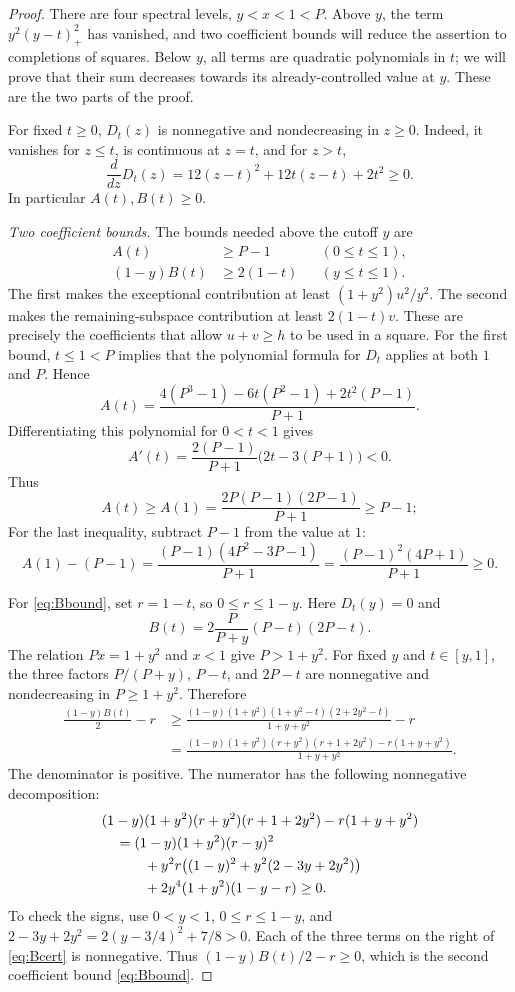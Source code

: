 \documentclass[11pt]{article}
\numberwithin{equation}{section}
\begin{document}
\begin{proof}
There are four spectral levels, $y<x<1<P$. Above $y$, the term
$y^2(y-t)_+^2$ has vanished, and two coefficient bounds will reduce
the assertion to completions of squares. Below $y$, all terms are
quadratic polynomials in $t$; we will prove that their sum decreases
towards its already-controlled value at $y$. These are the two parts
of the proof.

For fixed $t\ge0$, $D_t(z)$ is nonnegative and nondecreasing
in $z\ge0$. Indeed, it vanishes for $z\le t$, is continuous
at $z=t$, and for $z>t$,
\[
 \frac{d}{dz}D_t(z)=12(z-t)^2+12t(z-t)+2t^2\ge0.
\]
In particular $A(t),B(t)\ge0$.

\smallskip
\noindent\emph{Two coefficient bounds.}
The bounds needed above the cutoff $y$ are
\begin{align}
 A(t)&\ge P-1 &&(0\le t\le1),\label{eq:Abound}\\
 (1-y)B(t)&\ge2(1-t) &&(y\le t\le1).\label{eq:Bbound}
\end{align}
The first makes the exceptional contribution at least
$(1+y^2)u^2/y^2$. The second makes the remaining-subspace
contribution at least $2(1-t)v$. These are precisely the
coefficients that allow $u+v\ge h$ to be used in a square.
For the first bound, $t\le1<P$ implies that the polynomial
formula for $D_t$ applies at both $1$ and $P$. Hence
\[
 A(t)=\frac{4(P^3-1)-6t(P^2-1)+2t^2(P-1)}{P+1}.
\]
Differentiating this polynomial for $0<t<1$ gives
\[
 A'(t)=\frac{2(P-1)}{P+1}\bigl(2t-3(P+1)\bigr)<0.
\]
Thus
\[
 A(t)\ge A(1)=\frac{2P(P-1)(2P-1)}{P+1}\ge P-1;
\]
For the last inequality, subtract $P-1$ from the value at $1$:
\[
 A(1)-(P-1)
  =\frac{(P-1)(4P^2-3P-1)}{P+1}
  =\frac{(P-1)^2(4P+1)}{P+1}\ge0.
\]

For \eqref{eq:Bbound}, set $r=1-t$, so $0\le r\le1-y$. Here $D_t(y)=0$ and
\[
 B(t)=2\frac{P}{P+y}(P-t)(2P-t).
\]
The relation $Px=1+y^2$ and $x<1$ give $P>1+y^2$.
For fixed $y$ and $t\in[y,1]$, the three factors
$P/(P+y)$, $P-t$, and $2P-t$ are nonnegative and nondecreasing
in $P\ge1+y^2$. Therefore
\begin{align*}
 \frac{(1-y)B(t)}2-r
 &\ge\frac{(1-y)(1+y^2)(1+y^2-t)(2+2y^2-t)}{1+y+y^2}-r\\
 &=\frac{(1-y)(1+y^2)(r+y^2)(r+1+2y^2)-r(1+y+y^2)}{1+y+y^2}.
\end{align*}
The denominator is positive. The numerator has the following
nonnegative decomposition:
\begin{align}\label{eq:Bcert}
 &(1-y)(1+y^2)(r+y^2)(r+1+2y^2)-r(1+y+y^2)\notag\\
 &\quad=(1-y)(1+y^2)(r-y)^2\notag\\
 &\qquad\quad+y^2r\bigl((1-y)^2+y^2(2-3y+2y^2)\bigr)\notag\\
 &\qquad\quad+2y^4(1+y^2)(1-y-r)\ge0.
\end{align}
To check the signs, use $0<y<1$, $0\le r\le1-y$, and
$2-3y+2y^2=2(y-3/4)^2+7/8>0$. Each of the three terms on the
right of \eqref{eq:Bcert} is nonnegative. Thus
$(1-y)B(t)/2-r\ge0$, which is the second coefficient bound
\eqref{eq:Bbound}.


\end{proof}
\end{document}
